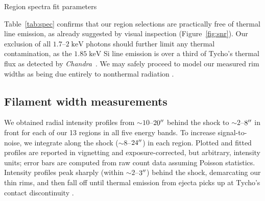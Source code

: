 \documentclass[iop, apj, numberedappendix, twocolappendix]{emulateapj}
\newcommand*{\mt}{\mathrm}
\newcommand*{\unit}[1]{\;\mt{#1}}  %
\newcommand*{\abt}{\mathord{\sim}} %
\newcommand*{\Chandra}{\textit{Chandra}\ }
\begin{document}
\begin{table}
    \scriptsize
    \centering
    \caption{Region spectra fit parameters\label{tab:spec}}
    
\end{table}

Table~\ref{tab:spec} confirms that our region selections are practically free
of thermal line emission, as already suggested by visual inspection
(Figure~\ref{fig:snr}).  Our exclusion of all $1.7$--$2
\unit{keV}$ photons should further limit any thermal contamination, as
the $1.85 \unit{keV}$ Si line emission is over a third of Tycho's thermal flux
as detected by \Chandra \citep{hwang2002}.  We may safely proceed to model our
measured rim widths as being due entirely to nonthermal radiation
.

\subsection{Filament width measurements}
\label{sec:fwhms}

We obtained radial intensity profiles from $\abt 10$--$20\mbox{$^{\prime\prime}$}$ behind the
shock to $\abt 2$--$8\mbox{$^{\prime\prime}$}$ in front for each of our 13 regions in all five
energy bands.  To increase signal-to-noise, we integrate along the shock ($\abt
8$--$24\mbox{$^{\prime\prime}$}$) in each region.  Plotted and fitted profiles are reported in
vignetting and exposure-corrected, but arbitrary, intensity units; error bars
are computed from raw count data assuming Poisson statistics.  Intensity
profiles peak sharply (within $\abt 2$--$3\mbox{$^{\prime\prime}$}$) behind the shock,
demarcating our thin rims, and then fall off until thermal emission from ejecta
picks up at Tycho's contact discontinuity \citep{warren2005}.
\end{document}
